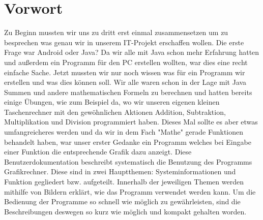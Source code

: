 
\ihead{\headmark}
\cfoot{\pagemark}


\section{Vorwort}
Zu Beginn mussten wir uns zu dritt erst einmal zusammensetzen um zu besprechen was genau wir in unserem IT-Projekt erschaffen wollen. Die erste Frage war Android oder Java? Da wir alle mit Java schon mehr Erfahrung hatten und außerdem ein Programm für den PC erstellen wollten, war dies eine recht einfache Sache. Jetzt mussten wir nur noch wissen was für ein Programm wir erstellen und was dies können soll. 
\newline
Wir alle waren schon in der Lage mit Java Summen und andere mathematischen Formeln zu berechnen und hatten bereits einige Übungen, wie zum Beispiel da, wo wir unseren eigenen kleinen Taschenrechner mit den gewöhnlichen Aktionen Addition, Subtraktion, Multiplikation und Division programmiert haben. Dieses Mal sollte es aber etwas umfangreicheres werden und da wir in dem Fach "Mathe" gerade Funktionen behandelt haben, war unser erster Gedanke ein Programm welches bei Eingabe einer Funktion die entsprechende Grafik dazu anzeigt.
\newline
\newline
Diese Benutzerdokumentation beschreibt systematisch die Benutzung des Programms Grafikrechner. Diese sind in zwei Hauptthemen: Systeminformationen und Funktion gegliedert bzw. aufgeteilt.
Innerhalb der jeweiligen Themen werden mithilfe von Bildern erklärt, wie das Programm verwendet werden kann. Um die Bedienung der Programme so schnell wie möglich zu gewährleisten, sind die Beschreibungen deswegen so kurz wie möglich und kompakt gehalten worden. 




\newpage